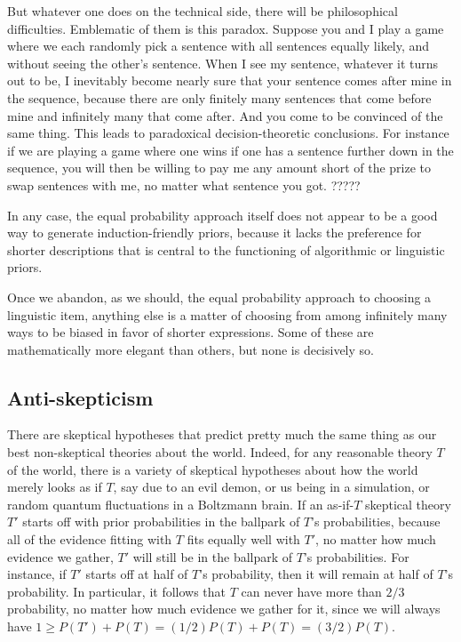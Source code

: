 But whatever one does on the technical side, there will be philosophical
difficulties. Emblematic of them is this paradox. Suppose you and I play a game where we each randomly pick a sentence with
all sentences equally likely, and without seeing the other's sentence. When I see my sentence, whatever it turns out to be, I inevitably become nearly sure that your 
sentence comes after mine in the sequence, because there are only finitely many sentences that come before mine and infinitely
many that come after. And you come to be convinced of the same thing. This leads to paradoxical decision-theoretic conclusions.
For instance if we are playing a game where one wins if one has a sentence further down in the sequence, you will then be willing to pay
me any amount short of the prize to swap sentences with me, no matter what sentence you got. ?????

In any case, the equal probability approach itself does not appear to be a good way to generate induction-friendly priors, 
because it lacks the preference for shorter descriptions that is central to the functioning of algorithmic or linguistic
priors. 

Once we abandon, as we should, the equal probability approach to choosing a linguistic item, anything else is a matter 
of choosing from among infinitely many ways to be biased in favor of shorter expressions. Some of these are mathematically
more elegant than others, but none is decisively so.

\subsection{Anti-skepticism}
There are skeptical hypotheses that predict pretty much the same thing as our best non-skeptical theories
about the world. Indeed, for any reasonable theory $T$ of the world, there is a variety of skeptical hypotheses about
how the world merely looks as if $T$, say due to an evil demon, or us being in a simulation, or random quantum 
fluctuations in a Boltzmann brain. If an as-if-$T$ skeptical theory $T'$ starts off with prior probabilities in 
the ballpark of $T$'s probabilities, because all of the evidence fitting with $T$ fits equally well with $T'$, 
no matter how much evidence we gather, $T'$ will still be in the ballpark of $T$'s probabilities. For instance, if
$T'$ starts off at half of $T$'s probability, then it will remain at half of $T$'s probability. In particular, 
it follows that $T$ can never have more than $2/3$ probability, no matter how much evidence we gather for it,
since we will always have $1 \ge P(T')+P(T) = (1/2)P(T)+P(T) = (3/2)P(T)$. 

